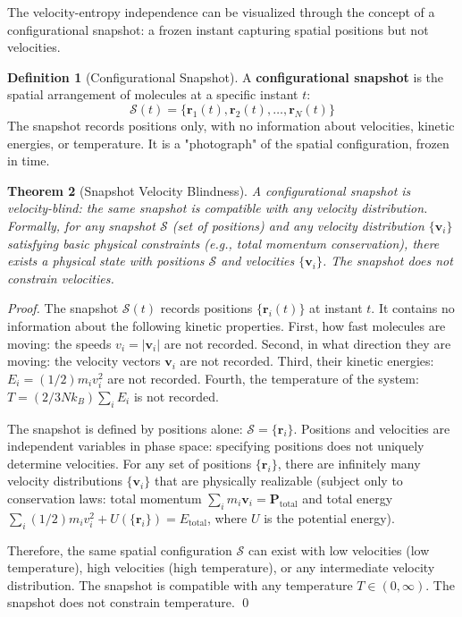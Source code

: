 \documentclass[12pt,a4paper]{article}
\newtheorem{theorem}{Theorem}[section]
\theoremstyle{definition}
\newtheorem{definition}[theorem]{Definition}
\theoremstyle{remark}
\begin{document}
The velocity-entropy independence can be visualized through the concept of a configurational snapshot: a frozen instant capturing spatial positions but not velocities.

\begin{definition}[Configurational Snapshot]
\label{def:snapshot}
A \textbf{configurational snapshot} is the spatial arrangement of molecules at a specific instant $t$:
\begin{equation}
\mathcal{S}(t) = \{\mathbf{r}_1(t), \mathbf{r}_2(t), \ldots, \mathbf{r}_N(t)\}
\label{eq:snapshot}
\end{equation}
The snapshot records positions only, with no information about velocities, kinetic energies, or temperature. It is a "photograph" of the spatial configuration, frozen in time.
\end{definition}

\begin{theorem}[Snapshot Velocity Blindness]
\label{thm:snapshot_blind}
A configurational snapshot is velocity-blind: the same snapshot is compatible with any velocity distribution. Formally, for any snapshot $\mathcal{S}$ (set of positions) and any velocity distribution $\{\mathbf{v}_i\}$ satisfying basic physical constraints (e.g., total momentum conservation), there exists a physical state with positions $\mathcal{S}$ and velocities $\{\mathbf{v}_i\}$. The snapshot does not constrain velocities.
\end{theorem}

\begin{proof}
The snapshot $\mathcal{S}(t)$ records positions $\{\mathbf{r}_i(t)\}$ at instant $t$. It contains no information about the following kinetic properties. First, how fast molecules are moving: the speeds $v_i = |\mathbf{v}_i|$ are not recorded. Second, in what direction they are moving: the velocity vectors $\mathbf{v}_i$ are not recorded. Third, their kinetic energies: $E_i = (1/2) m_i v_i^2$ are not recorded. Fourth, the temperature of the system: $T = (2/3N k_B) \sum_i E_i$ is not recorded.

The snapshot is defined by positions alone: $\mathcal{S} = \{\mathbf{r}_i\}$. Positions and velocities are independent variables in phase space: specifying positions does not uniquely determine velocities. For any set of positions $\{\mathbf{r}_i\}$, there are infinitely many velocity distributions $\{\mathbf{v}_i\}$ that are physically realizable (subject only to conservation laws: total momentum $\sum_i m_i \mathbf{v}_i = \mathbf{P}_{\text{total}}$ and total energy $\sum_i (1/2) m_i v_i^2 + U(\{\mathbf{r}_i\}) = E_{\text{total}}$, where $U$ is the potential energy).

Therefore, the same spatial configuration $\mathcal{S}$ can exist with low velocities (low temperature), high velocities (high temperature), or any intermediate velocity distribution. The snapshot is compatible with any temperature $T \in (0, \infty)$. The snapshot does not constrain temperature. \qed
\end{proof}
\end{document}
